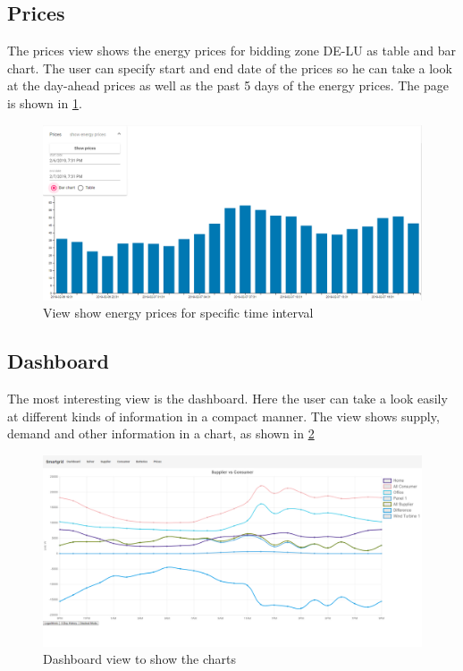 \subsection{Prices}
The prices view shows the energy prices for bidding zone DE-LU as table and bar chart.
The user can specify start and end date of the prices so he can take a look at the day-ahead prices as well as the past 5 days of the energy prices.
The page is shown in \cref{fig:prices}.

\begin{figure}[!h]
    \centering
\includegraphics[width=1.00\textwidth]{../figures/prices.PNG}
    \caption{View show energy prices for specific time interval}
    \label{fig:prices}
\end{figure}

\subsection{Dashboard}
The most interesting view is the dashboard.
Here the user can take a look easily at different kinds of information in a compact manner.
The view shows supply, demand and other information in a chart, as shown in \cref{fig:dashboard}

\begin{figure}[!h]
    \centering
\includegraphics[width=1.00\textwidth]{../figures/Overview.png}
    \caption{Dashboard view to show the charts}
    \label{fig:dashboard}
\end{figure}

